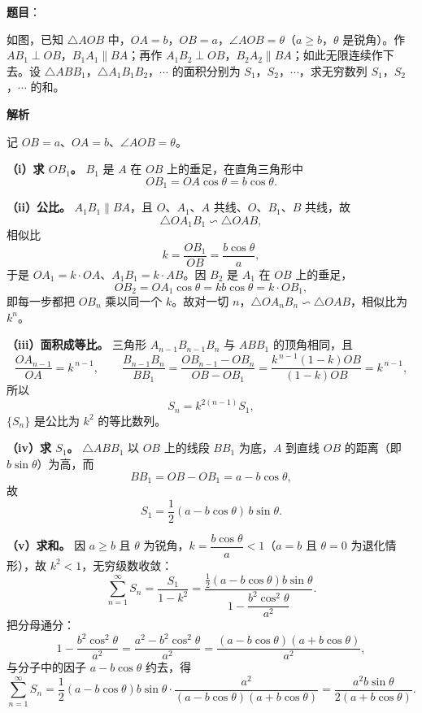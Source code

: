 \begin{answer}

\textbf{题目}：

如图，已知 $\triangle AOB$ 中，$OA=b$，$OB=a$，$\angle AOB=\theta$（$a\ge b$，$\theta$ 是锐角）。作 $AB_1\perp OB$，$B_1A_1\parallel BA$；再作 $A_1B_2\perp OB$，$B_2A_2\parallel BA$；如此无限连续作下去。设 $\triangle ABB_1$，$\triangle A_1B_1B_2$，$\cdots$ 的面积分别为 $S_1$，$S_2$，$\cdots$，求无穷数列 $S_1$，$S_2$，$\cdots$ 的和。
\nopagebreak[4]
\begin{center}\end{center}
\nopagebreak[4]
\textbf{解析}
\nopagebreak[4]
\begin{center}\end{center}
\nopagebreak[4]
记 $OB=a$、$OA=b$、$\angle AOB=\theta$。

\textbf{（i）求 $OB_1$。} $B_1$ 是 $A$ 在 $OB$ 上的垂足，在直角三角形中
\nopagebreak[4]
\[
OB_1=OA\cos\theta=b\cos\theta.
\]

\textbf{（ii）公比。} $A_1B_1\parallel BA$，且 $O$、$A_1$、$A$ 共线、$O$、$B_1$、$B$ 共线，故
\nopagebreak[4]
\[
\triangle OA_1B_1\backsim\triangle OAB,
\]
相似比
\nopagebreak[4]
\[
k=\frac{OB_1}{OB}=\frac{b\cos\theta}{a},
\]
于是 $OA_1=k\cdot OA$、$A_1B_1=k\cdot AB$。因 $B_2$ 是 $A_1$ 在 $OB$ 上的垂足，
\nopagebreak[4]
\[
OB_2=OA_1\cos\theta=kb\cos\theta=k\cdot OB_1,
\]
即每一步都把 $OB_n$ 乘以同一个 $k$。故对一切 $n$，$\triangle OA_nB_n\backsim\triangle OAB$，相似比为 $k^n$。

\textbf{（iii）面积成等比。} 三角形 $A_{n-1}B_{n-1}B_n$ 与 $ABB_1$ 的顶角相同，且
\nopagebreak[4]
\[
\frac{OA_{n-1}}{OA}=k^{\,n-1},\qquad
\frac{B_{n-1}B_n}{BB_1}=\frac{OB_{n-1}-OB_n}{OB-OB_1}=\frac{k^{\,n-1}(1-k)OB}{(1-k)OB}=k^{\,n-1},
\]
所以
\nopagebreak[4]
\[
S_n=k^{2(n-1)}S_1,
\]
$\{S_n\}$ 是公比为 $k^2$ 的等比数列。

\textbf{（iv）求 $S_1$。} $\triangle ABB_1$ 以 $OB$ 上的线段 $BB_1$ 为底，$A$ 到直线 $OB$ 的距离（即 $b\sin\theta$）为高，而
\nopagebreak[4]
\[
BB_1=OB-OB_1=a-b\cos\theta,
\]
故
\nopagebreak[4]
\[
S_1=\frac12(a-b\cos\theta)\,b\sin\theta.
\]

\textbf{（v）求和。} 因 $a\ge b$ 且 $\theta$ 为锐角，$k=\dfrac{b\cos\theta}{a}<1$（$a=b$ 且 $\theta=0$ 为退化情形），故 $k^2<1$，无穷级数收敛：
\nopagebreak[4]
\[
\sum_{n=1}^{\infty}S_n=\frac{S_1}{1-k^2}
=\frac{\frac12(a-b\cos\theta)b\sin\theta}{1-\dfrac{b^2\cos^2\theta}{a^2}}.
\]
把分母通分：
\nopagebreak[4]
\[
1-\frac{b^2\cos^2\theta}{a^2}=\frac{a^2-b^2\cos^2\theta}{a^2}
=\frac{(a-b\cos\theta)(a+b\cos\theta)}{a^2},
\]
与分子中的因子 $a-b\cos\theta$ 约去，得
\nopagebreak[4]
\[
\sum_{n=1}^{\infty}S_n=\frac12(a-b\cos\theta)b\sin\theta\cdot\frac{a^2}{(a-b\cos\theta)(a+b\cos\theta)}
=\frac{a^2b\sin\theta}{2(a+b\cos\theta)}.
\]


\end{answer}
